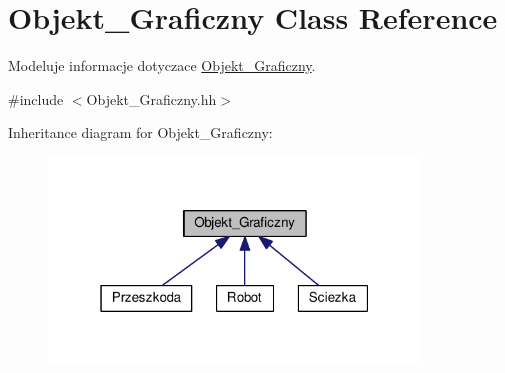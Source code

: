 \hypertarget{class_objekt___graficzny}{\section{Objekt\+\_\+\+Graficzny Class Reference}
\label{class_objekt___graficzny}
}


Modeluje informacje dotyczace \hyperlink{class_objekt___graficzny}{Objekt\+\_\+\+Graficzny}.  




{\ttfamily \#include $<$Objekt\+\_\+\+Graficzny.\+hh$>$}



Inheritance diagram for Objekt\+\_\+\+Graficzny\+:\nopagebreak
\begin{figure}[H]
\begin{center}
\leavevmode
\includegraphics[width=280pt]{class_objekt___graficzny__inherit__graph}
\end{center}
\end{figure}
